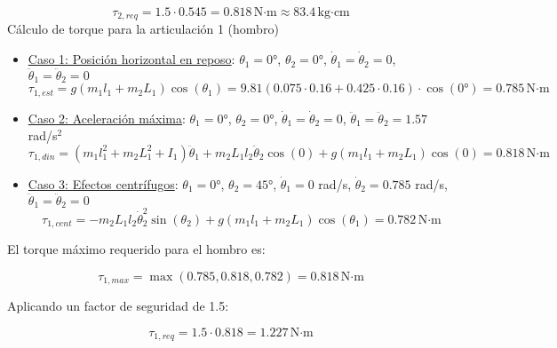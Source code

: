 \begin{equation}
\tau_{2,req} = 1.5 \cdot 0.545 = 0.818 \, \text{N·m} \approx 83.4 \, \text{kg·cm}
\end{equation}
Cálculo de torque para la articulación 1 (hombro)
\begin{itemize}[label=$\bullet$]
\item \underline{Caso 1: Posición horizontal en reposo}: $\theta_1 = 0°$, $\theta_2 = 0°$, $\dot{\theta}_1 = \dot{\theta}_2 = 0$, $\ddot{\theta}_1 = \ddot{\theta}_2 = 0$\\

\begin{equation}
\tau_{1,est} = g(m_1l_1 + m_2L_1)\cos(\theta_1)
= 9.81(0.075 \cdot 0.16 + 0.425 \cdot 0.16) \cdot \cos(0°)
= 0.785 \, \text{N·m}
\end{equation}
\item \underline{Caso 2: Aceleración máxima}: $\theta_1 = 0°$, $\theta_2 = 0°$, $\dot{\theta}_1 = \dot{\theta}_2 = 0$, $\ddot{\theta}_1 = \ddot{\theta}_2 = 1.57$ rad/s$^2$\\

\begin{equation}
\tau_{1,din} = (m_1l_1^2 + m_2L_1^2 + I_1)\ddot{\theta}_1 + m_2L_1l_2\ddot{\theta}_2\cos(0) + g(m_1l_1 + m_2L_1)\cos(0) = 0.818 \, \text{N·m}
\end{equation}

\item \underline{Caso 3: Efectos centrífugos}: $\theta_1 = 0°$, $\theta_2 = 45°$, $\dot{\theta}_1 = 0$ rad/s, $\dot{\theta}_2 = 0.785$ rad/s, $\ddot{\theta}_1 = \ddot{\theta}_2 = 0$ \\

\begin{equation}
\tau_{1,cent} = - m_2L_1l_2\dot{\theta}_2^2\sin(\theta_2) + g(m_1l_1 + m_2L_1)\cos(\theta_1) = 0.782 \, \text{N·m}
\end{equation}
\end{itemize}
El torque máximo requerido para el hombro es:

\begin{equation}
\tau_{1,max} = \max(0.785, 0.818, 0.782) = 0.818 \, \text{N·m} 
\end{equation}

Aplicando un factor de seguridad de 1.5:

\begin{equation}
\tau_{1,req} = 1.5 \cdot 0.818 = 1.227 \, \text{N·m}
\end{equation}

